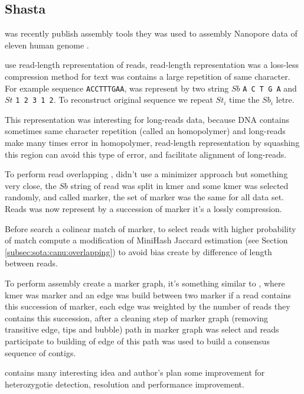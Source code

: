 \documentclass[main]{subfiles}
\begin{document}
\subsection{Shasta}

\newcommand{\shasta}{}

\shasta was recently publish assembly tools they was used to assembly Nanopore data of eleven human genome \cite{Shasta}.

\shasta use read-length representation of reads, read-length representation was a loss-less compression method for text was contains a large repetition of same character. For example sequence \texttt{ACCTTTGAA}, was represent by two string $Sb$ \texttt{A C T G A} and $St$ \texttt{1 2 3 1 2}. To reconstruct original sequence we repeat $St_i$ time the $Sb_i$ letre.

This representation was interesting for long-reads data, because DNA contains sometimes same character repetition (called an homopolymer) and long-reads make many times error in homopolymer, read-length representation by squashing this region can avoid this type of error, and facilitate alignment of long-reads.

To perform read overlapping \shasta, didn't use a minimizer approach but something very close, the $Sb$ string of read was split in kmer and some kmer was selected randomly, and called marker, the set of marker was the same for all data set. Reads was now represent by a succession of marker it's a lossly compression.

Before search a colinear match of marker, to select reads with higher probability of match \shasta compute a modification of MiniHash Jaccard estimation (see Section \ref{subsec:sota:canu:overlapping}) to avoid bias create by difference of length between reads.

To perform assembly \shasta create a marker graph, it's something similar to \DBG, where kmer was marker and an edge was build between two marker if a read contains this succession of marker, each edge was weighted by the number of reads they contains this succession, after a cleaning step of marker graph (removing transitive edge, tips and bubble) path in marker graph was select and reads participate to building of edge of this path was used to build a consensus sequence of contigs.

\shasta contains many interesting idea and author's plan some improvement for heterozygotie detection, resolution and performance improvement.
\end{document}
